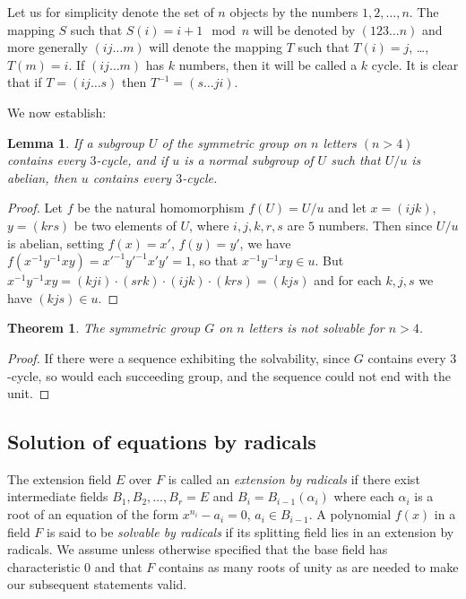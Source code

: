 \documentclass[10pt,leqno]{article}
\newtheorem{theo}{Theorem}
\newtheorem*{lemm*}{Lemma}
\theoremstyle{definition}
\begin{document}
Let us for simplicity denote the set of $n$ objects by the numbers $1,2,\ldots,n$.
The mapping $S$ such that $S(i) = i+1 \mod n$ will be denoted by $(123 \ldots n)$ and more generally $(ij\ldots m)$ will denote the mapping $T$ such that $T(i) = j$, \ldots, $T(m) = i$.
If $(ij\ldots m)$ has $k$ numbers, then it will be called a $k$ cycle.
It is clear that if $T = (ij\ldots s)$ then $T^{-1} = (s \ldots ji)$.

We now establish:

\begin{lemm*}
If a subgroup $U$ of the symmetric group on $n$ letters $(n > 4)$ contains every $3$-cycle, and if $u$ is a normal subgroup of $U$ such that $U / u$ is abelian, then $u$ contains every $3$-cycle.
\end{lemm*}


\begin{proof}
Let $f$ be the natural homomorphism $f(U) = U/u$ and let $x = (ijk)$, $y = (krs)$ be two elements of $U$, where $i,j,k,r,s$ are $5$ numbers.
Then since $U/u$ is abelian, setting $f(x) = x'$, $f(y) = y'$, we have $f(x^{-1}y^{-1}xy) = {x'}^{-1} {y'}^{-1} x' y' = 1$, so that $x^{-1}y^{-1}xy \in u$.
But $x^{-1}y^{-1}xy = (kji) \cdot (srk) \cdot (ijk) \cdot (krs) = (kjs)$ and for each $k,j,s$ we have $(kjs) \in u$.
\end{proof}

\begin{theo}
\label{theo:III.4}
The symmetric group $G$ on $n$ letters is not solvable for $n > 4$.
\end{theo}

\begin{proof}
If there were a sequence exhibiting the solvability, since $G$ contains every $3$-cycle, so would each succeeding group, and the sequence could not end with the unit.
\end{proof}


\subsection{Solution of equations by radicals}

The extension field $E$ over $F$ is called an \emph{extension by radicals} if there exist intermediate fields $B_1, B_2, \ldots, B_r = E$ and $B_i = B_{i-1}(\alpha_i)$ where each $\alpha_i$ is a root of an equation of the form $x^{n_i} - a_i = 0$, $a_i \in B_{i-1}$.
A polynomial $f(x)$ in a field $F$ is said to be \emph{solvable by radicals} if its splitting field lies in an extension by radicals.
We assume unless otherwise specified that the base field has characteristic $0$ and that $F$ contains as many roots of unity as are needed to make our subsequent statements valid.
\end{document}
